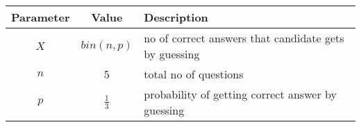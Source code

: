 

\begin{center}
\begin{tabular}{|c|c|l|}
\hline
 Parameter&  Value &Description\\ \hline
 $X$ & $bin(n,p)$ & no of correct answers  that candidate gets by guessing\\\hline
$n$ &  5 & total no of questions\\ \hline
 $p$ &  $\frac{1}{3}$ & probability of getting correct answer by guessing\\\hline

\end{tabular}
\end{center}